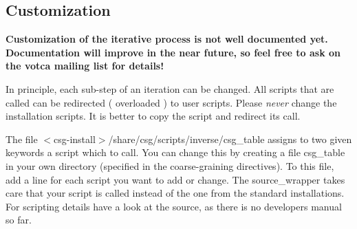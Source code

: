 \subsection{Customization}
\textbf{Customization of the iterative process is not well documented yet. Documentation will improve in the near future, so feel free to ask on the votca mailing list for details! }

In principle, each sub-step of an iteration can be changed. All scripts that are called can be redirected ( overloaded ) to user scripts. Please {\em never} change the \votca installation scripts. It is better to copy the script and redirect its call.

The file $<$csg-install$>$/share/csg/scripts/inverse/csg\_table assigns to two given keywords a script which to call. You can change this by creating a file
csg\_table in your own directory (specified in the coarse-graining directives). To this file, add a line for each script you want to add or change. The source\_wrapper takes care that your script is called instead of the one from the standard installations. For scripting details have a look at the source, as there is no developers manual so far.

